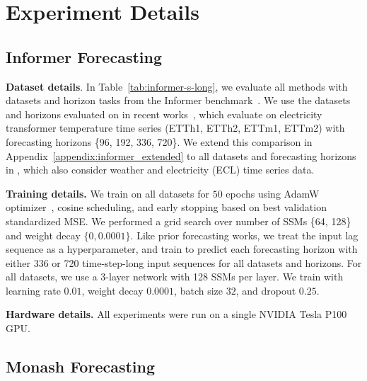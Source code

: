 \section{Experiment Details} \label{app:exp_details}


%

%



\subsection{Informer Forecasting} \label{app:informer_details}

\textbf{Dataset details}. In Table~\ref{tab:informer-s-long}, we evaluate all methods with datasets and horizon tasks from the Informer benchmark~\citep{zhou2021informer}. We use the datasets and horizons evaluated on in recent works~\citep{wu2021autoformer, zhou2022fedformer, zhou2022film, zeng2022transformers}, which evaluate on electricity transformer temperature time series (ETTh1, ETTh2, ETTm1, ETTm2) with forecasting horizons \{96, 192, 336, 720\}. 
We extend this comparison in Appendix~\ref{appendix:informer_extended} to all datasets and forecasting horizons in \cite{zhou2021informer}, which also consider weather and electricity (ECL) time series data. 

\textbf{Training details.}
%
We train \ourmethod{} on all datasets for $50$ epochs using AdamW optimizer~\citep{loshchilov2017decoupled}, cosine scheduling, and early stopping based on best validation standardized MSE. We performed a grid search over number of SSMs \{64, 128\} and weight decay $\{0, 0.0001\}$. Like prior forecasting works, we treat the input lag sequence as a hyperparameter, and train to predict each forecasting horizon with either 336 or 720 time-step-long input sequences for all datasets and horizons. 
%
For all datasets, we use a 3-layer \ourmethod{} network with 128 SSMs per layer. We train with learning rate $0.01$, weight decay $0.0001$, batch size $32$, and dropout $0.25$. 

\textbf{Hardware details.}
All experiments were run on a single NVIDIA Tesla P100 GPU.




%
\subsection{Monash Forecasting} \label{app:monash_details} 

